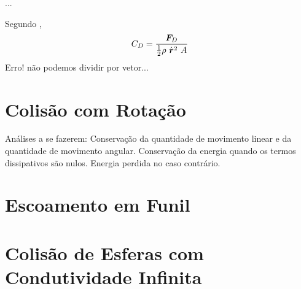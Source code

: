 \alert{...}

Segundo ,
\begin{equation*}
	\dragCoefficient = \dfrac{\dragForce}{\frac{1}{2}\density\ \velocity^2\ \projectedArea}
\end{equation*}
\alert{Erro! não podemos dividir por vetor...}

\section{Colisão com Rotação}

\alert{Análises a se fazerem: Conservação da quantidade de movimento linear e da quantidade de movimento angular. Conservação da energia quando os termos dissipativos são nulos. Energia perdida no caso contrário.}

\section{Escoamento em Funil}
\section{Colisão de Esferas com Condutividade Infinita}